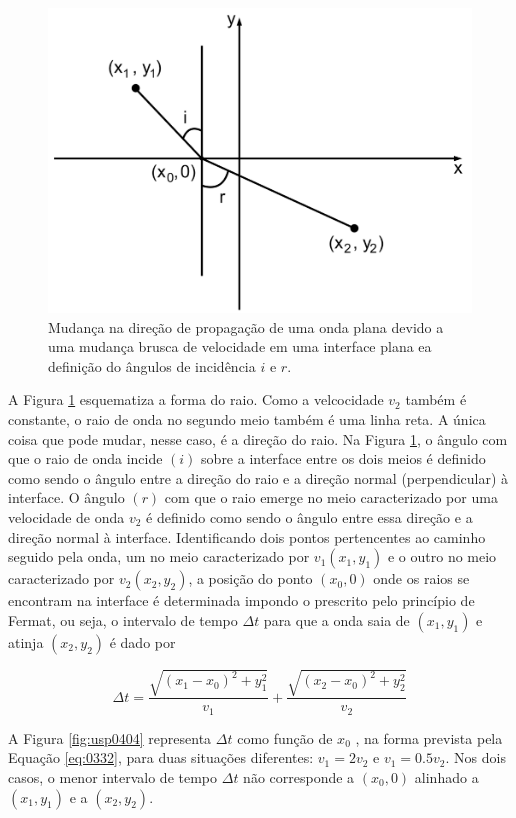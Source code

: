 \documentclass[]{book}
\theoremstyle{definition}
\theoremstyle{definition}
\theoremstyle{definition}
\theoremstyle{remark}
\begin{document}
\begin{figure}

{\centering \includegraphics[width=0.5\linewidth]{fig/figU03} 

}

\caption{Mudança na direção de propagação de uma onda plana devido a uma mudança brusca de velocidade em uma interface plana ea definição do ângulos de incidência $i$ e $r$.}\label{fig:usp0403}
\end{figure}

A Figura \ref{fig:usp0403} esquematiza a forma do raio. Como a velcocidade \(v_2\) também é constante, o raio de onda no segundo meio também é uma linha reta. A única coisa que pode mudar, nesse caso, é a direção do raio. Na Figura \ref{fig:usp0403}, o ângulo com que o raio de onda incide \((i)\) sobre a interface entre os dois meios é definido como sendo o ângulo entre a direção do raio e a direção normal (perpendicular) à interface. O ângulo \((r)\) com que o raio emerge no meio caracterizado por uma velocidade de onda \(v_2\) é definido como sendo o ângulo entre essa direção e a direção normal à interface. Identificando dois pontos pertencentes ao caminho seguido pela onda, um no meio caracterizado por \(v_1(x_1 , y_1)\) e o outro no meio caracterizado por \(v_2 (x_2 , y_2)\), a posição do ponto \((x_0,0)\) onde os raios se encontram na interface é determinada impondo o prescrito pelo princípio de Fermat, ou seja, o intervalo de tempo \(\Delta t\) para que a onda saia de \((x_1 , y_1)\) e atinja \((x_2 , y_2)\) é dado por

\begin{equation}
\Delta t=\frac{\sqrt{\left(x_{1}-x_{0}\right)^{2}+y_{1}^{2}}}{v_{1}}+\frac{\sqrt{\left(x_{2}-x_{0}\right)^{2}+y_{2}^{2}}}{v_{2}}  \label{eq:0332}
\end{equation}

A Figura \ref{fig:usp0404} representa \(\Delta t\) como função de \(x_0\) , na forma prevista pela Equação \eqref{eq:0332}, para duas situações diferentes: \(v_1 = 2v_2\) e \(v_1 = 0.5v_2\). Nos dois casos, o menor intervalo de tempo \(\Delta t\) não corresponde a \((x_0, 0)\) alinhado a \((x_1, y_1)\) e a \((x_2 , y_2)\).
\end{document}
